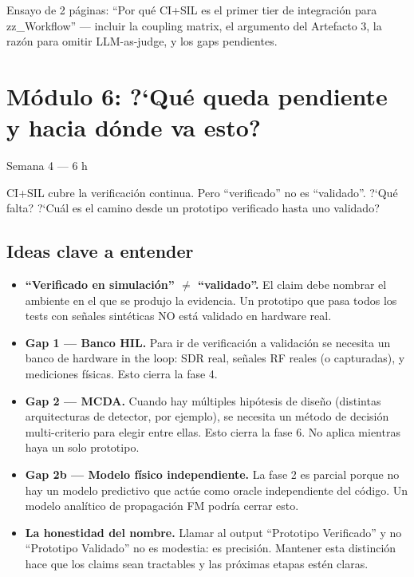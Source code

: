 \documentclass[11pt,a4paper]{article}
\newcommand{\timeest}[1]{\textsf{\footnotesize\color{muted}#1}}
\begin{document}
\begin{deliverbox}[Entregable]
Ensayo de 2 p\'aginas: ``Por qu\'e CI+SIL es el primer tier de integraci\'on para zz\_Workflow'' --- incluir la coupling matrix, el argumento del Artefacto 3, la raz\'on para omitir LLM-as-judge, y los gaps pendientes.
\end{deliverbox}

\section{M\'odulo 6: ?`Qu\'e queda pendiente y hacia d\'onde va esto?}
\timeest{Semana 4 --- 6 h}

\begin{goalbox}
CI+SIL cubre la verificaci\'on continua. Pero ``verificado'' no es ``validado''. ?`Qu\'e falta? ?`Cu\'al es el camino desde un prototipo verificado hasta uno validado?
\end{goalbox}

\subsection{Ideas clave a entender}
\begin{itemize}
  \item \textbf{``Verificado en simulaci\'on'' $\neq$ ``validado''.} El claim debe nombrar el ambiente en el que se produjo la evidencia. Un prototipo que pasa todos los tests con se\~nales sint\'eticas NO est\'a validado en hardware real.
  \item \textbf{Gap 1 --- Banco HIL.} Para ir de verificaci\'on a validaci\'on se necesita un banco de hardware in the loop: SDR real, se\~nales RF reales (o capturadas), y mediciones f\'isicas. Esto cierra la fase 4.
  \item \textbf{Gap 2 --- MCDA.} Cuando hay m\'ultiples hip\'otesis de dise\~no (distintas arquitecturas de detector, por ejemplo), se necesita un m\'etodo de decisi\'on multi-criterio para elegir entre ellas. Esto cierra la fase 6. No aplica mientras haya un solo prototipo.
  \item \textbf{Gap 2b --- Modelo f\'isico independiente.} La fase 2 es parcial porque no hay un modelo predictivo que act\'ue como oracle independiente del c\'odigo. Un modelo anal\'itico de propagaci\'on FM podr\'ia cerrar esto.
  \item \textbf{La honestidad del nombre.} Llamar al output ``Prototipo Verificado'' y no ``Prototipo Validado'' no es modestia: es precisi\'on. Mantener esta distinci\'on hace que los claims sean tractables y las pr\'oximas etapas est\'en claras.
\end{itemize}
\end{document}
